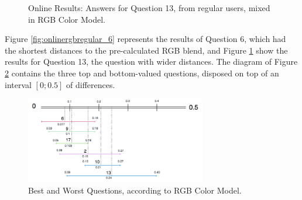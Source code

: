 \begin{figure}[!htbp]
\begin{minipage}{0.48\textwidth}
    \caption[Online Results: Answers for Question 13, from regular users, mixed in RGB Color Model.]{Online Results: Answers for Question 13, from regular users, mixed in RGB Color Model.}
    \label{fig:onlinergbregular_13}
  \end{minipage}
\end{figure}
%
Figure \ref{fig:onlinergbregular_6} represents the results of Question 6, which had the shortest distances to the pre-calculated RGB blend, and Figure \ref{fig:onlinergbregular_13} show the results for Question 13, the question with wider
distances. The diagram of Figure \ref{fig:rgb_analysis} contains the three top and bottom-valued questions, disposed on top of an interval $[0 ; 0.5]$ of differences. \par
%
\begin{figure}[!htbp]
  \centering
  \includegraphics[width=0.7\textwidth]{images/results/rgb_questions_analysis.png}
  \caption[Best and Worst Questions, according RGB Color Model.]{Best and Worst Questions, according to RGB Color Model.}
  \label{fig:rgb_analysis}
\end{figure}
%
%
